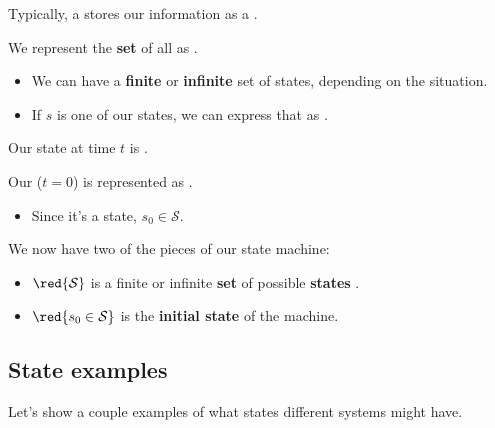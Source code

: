         \begin{notation}
            Typically, a   stores our information as a .
            
            We represent the \textbf{set} of all  as . 
            
            \begin{itemize}
                \item We can have a \textbf{finite} or \textbf{infinite} set of states, depending on the situation.
                \item If $s$ is one of our states, we can express that as .
            \end{itemize}

            \subsecdiv
            
            Our state at time $t$ is .
            
            Our  ($t=0$) is represented as .         
            \begin{itemize}
                \item Since it's a state, $s_0 \in \mathcal{S}$.
            \end{itemize}
        \end{notation}

        We now have two of the pieces of our state machine:
            
        \begin{itemize}
            \item $\red{\mathcal{S}}$ is a finite or infinite \textbf{set} of possible \textbf{states} .
            \item $\red{s_0 \in \mathcal{S}}$ is the \textbf{initial state} of the machine. 
        \end{itemize}

    \subsection{State examples}
        Let's show a couple examples of what states different systems might have.
        
